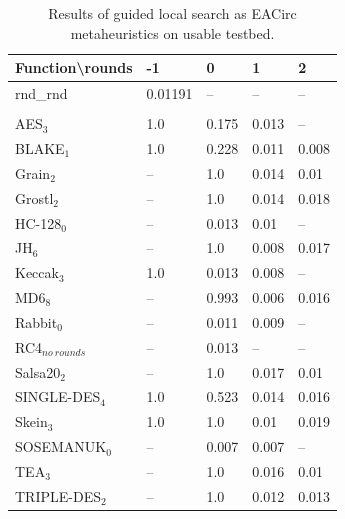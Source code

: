 \documentclass[
  print, %
  Table,   %
  nolof,     %
  nolot,     %
  11pt, %
  oneside  %
]{fithesis3}
\newcommand{\fd}{\cellcolor{red!13}}
\newcommand{\fn}{\cellcolor{green!13}}
\begin{document}
\begin{table}[H]
\centering
\begin{tabular}{l|l l l l}
Function\textbackslash{}rounds & -1 & 0 & 1 & 2\\ \hline
rnd\_rnd         & \fn{}0.01191 & --       & --         & --        \\\\
AES$_{3}$        & \fd{}1.0   & \fd{}0.175 & \fn{}0.013 & \fn{}--   \\
BLAKE$_{1}$      & \fd{}1.0   & \fd{}0.228 & \fn{}0.011 & \fn{}0.008\\
Grain$_{2}$      & \fd{}--    & \fd{}1.0   & \fn{}0.014 & \fn{}0.01 \\
Grostl$_{2}$     & \fd{}--    & \fd{}1.0   & \fn{}0.014 & \fn{}0.018\\
HC-128$_{0}$     & \fd{}--    & \fn{}0.013 & \fn{}0.01  & \fn{}--   \\
JH$_{6}$         & \fd{}--    & \fd{}1.0   & \fn{}0.008 & \fn{}0.017\\
Keccak$_{3}$     & \fd{}1.0   & \fn{}0.013 & \fn{}0.008 & \fn{}--   \\
MD6$_{8}$        & \fd{}--    & \fd{}0.993 & \fn{}0.006 & \fn{}0.016\\
Rabbit$_{0}$     & \fd{}--    & \fn{}0.011 & \fn{}0.009 & \fn{}--   \\
RC4$_{no~rounds}$& --         & \fn{}0.013 & --         & --        \\
Salsa20$_{2}$    & \fd{}--    & \fd{}1.0   & \fn{}0.017 & \fn{}0.01 \\
SINGLE-DES$_{4}$ & \fd{}1.0   & \fd{}0.523 & \fn{}0.014 & \fn{}0.016\\
Skein$_{3}$      & \fd{}1.0   & \fd{}1.0   & \fn{}0.01  & \fn{}0.019\\
SOSEMANUK$_{0}$  & \fd{}--    & \fn{}0.007 & \fn{}0.007 & \fn{}--   \\
TEA$_{3}$        & \fd{}--    & \fd{}1.0   & \fn{}0.016 & \fn{}0.01 \\
TRIPLE-DES$_{2}$ & \fd{}--    & \fd{}1.0   & \fn{}0.012 & \fn{}0.013
\end{tabular}
\caption{Results of guided local search as EACirc metaheuristics on usable testbed.}
\label{table:res-usable-gls}
\end{table}
\end{document}
